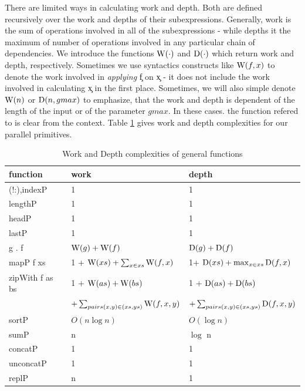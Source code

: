   There are limited ways in calculating work and depth. Both are defined
  recursively over the work and depths of their subexpressions. Generally,
  work is the sum of operations involved in all of the subexpressions
  - while depths it  the maximum of number of operations involved in
  any particular chain of dependencies.
  We introduce the functions $\textrm{W}(\cdot)$ and $\textrm{D}(\cdot)$ which return work
  and depth, respectively. Sometimes we use syntactics constructs
  like $\textrm{W}(f,x)$ to denote the work involved in \emph{applying}
  \c{f} on \c{x} - it does not include the work involved
  in calculating \c{x} in the first place. Sometimes,
  we will also simple denote $\textrm{W}(n)$ or $\textrm{D}(n,gmax)$ to emphasize,
  that the work and depth is dependent of the length of the input
  or of the parameter $gmax$. In these cases. the function refered to
  is clear from the context.
  Table \ref{table:workdepth} gives
  work and depth complexities for our parallel primitives.
  
  \begin{table}[h]
    \caption{Work and Depth complexities of general functions}
    \label{table:workdepth}
    \begin{center}
    \begin{tabular}{lll}
      \toprule
      function & work & depth \\
      \midrule
      (!:),indexP & 1 & 1 \\
      lengthP & 1 & 1 \\
      headP & 1 & 1 \\
      lastP & 1 & 1 \\
      g . f & $\textrm{W}(g) + \textrm{W}(f)$ & $\textrm{D}(g) + \textrm{D}(f)$ \\
      mapP f xs & 1 + $\textrm{W}(xs) + \sum_{x \in xs}\textrm{W}(f,x)$ & 1+ $\textrm{D}(xs) + \max_{x \in xs}\textrm{D}(f,x)$ \\
      zipWith f as bs & 1 + $\textrm{W}(as) + \textrm{W}(bs)$ & 1 + $\textrm{D}(as) + \textrm{D}(bs)$ \\
        & $+ \sum_{pairs (x,y) \in (xs,ys)}\textrm{W}(f,x,y)$ & $ + \sum_{pairs (x,y) \in (xs,ys)}\textrm{D}(f,x,y)$ \\
      sortP & $O(n \log n)$ & $O(\log n)$ \\
      sumP & n & $\log$ n \\
      concatP & 1 & 1 \\
      unconcatP & 1 & 1 \\
      replP &  n & 1 \\
    \end{tabular}
    \end{center}
  \end{table}
  
